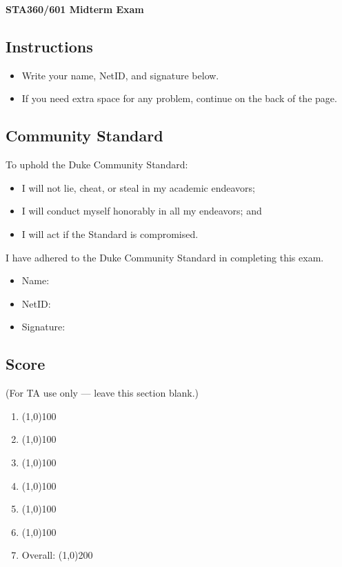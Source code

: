\documentclass[12pt]{article}
\begin{document}
\begin{center}
\large\textbf{STA360/601 Midterm Exam}
\end{center}

\small

\subsection*{Instructions}
\begin{itemize}
    \item Write your name, NetID, and signature below.
    \item If you need extra space for any problem, continue on the back of the page.
\end{itemize}

\subsection*{Community Standard}
To uphold the Duke Community Standard:
\begin{itemize}
\item I will not lie, cheat, or steal in my academic endeavors;
\item I will conduct myself honorably in all my endeavors; and
\item I will act if the Standard is compromised.
\end{itemize}
I have adhered to the Duke Community Standard in completing this exam.

\vspace{1em}
\begin{itemize}
    \setlength\itemsep{1em}
    \item[] Name: \hrulefill
    \item[] NetID: \hrulefill
    \item[] Signature: \hrulefill
\end{itemize}

\subsection*{Score}
(For TA use only --- leave this section blank.)

\vspace{1em}
\begin{enumerate}
    \setlength\itemsep{1em}
    \item \line(1,0){100}
    \item \line(1,0){100}
    \item \line(1,0){100}
    \item \line(1,0){100}
    \item \line(1,0){100}
    \item \line(1,0){100}
        \vspace{1em}
    \item[] Overall: \line(1,0){200}
\end{enumerate}
\end{document}
